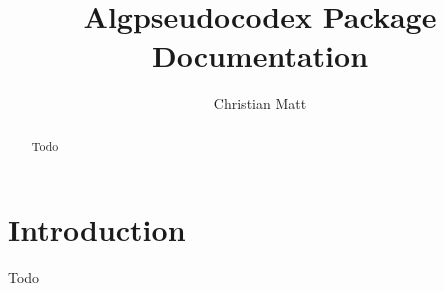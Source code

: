 \documentclass[11pt,a4paper,USenglish]{article}
\title{\bf{Algpseudocodex Package Documentation}}
\author{Christian Matt}
\begin{document}
\maketitle

\begin{abstract}
	Todo
\end{abstract}

\section{Introduction}
Todo
\end{document}
